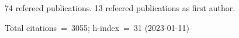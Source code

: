 74 refereed publications. 13 refeered publications as first author.

Total citations~=~3055; h-index~=~31 (2023-01-11)